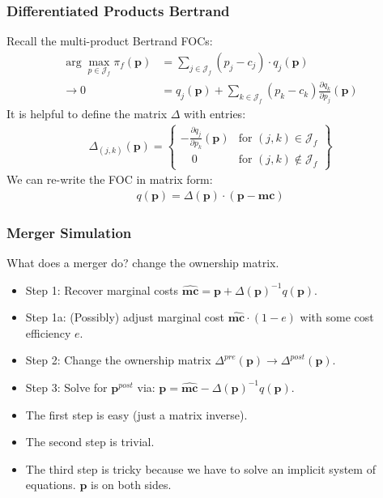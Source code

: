 \begin{frame}
\frametitle{Differentiated Products Bertrand}
\small
Recall the multi-product Bertrand FOCs:
\begin{align*}
\arg \max_{p \in \mathcal{J}_f} \pi_f (\mathbf{p}) &= \sum_{j \in \mathcal{J}_f} (p_j - c_j) \cdot q_j(\mathbf{p}) \\
\rightarrow 0&= q_j(\mathbf{p}) + \sum_{k \in \mathcal{J}_f} (p_k - c_k) \frac{\partial q_{k}}{\partial p_j}(\mathbf{p})
\end{align*}
It is helpful to define the matrix $\Delta$ with entries:
\begin{align*}
\Delta_{(j,k)}(\mathbf{p}) = \left\{\begin{array}{lr}
         - \frac{\partial q_{j}}{\partial p_k}(\mathbf{p}) & \text{for }  (j,k) \in \mathcal{J}_f\\
       	  \quad 0 & \text{for } (j,k) \notin \mathcal{J}_f
        \end{array} \right\}
\end{align*}
We can re-write the FOC in matrix form:
\begin{align*}
q(\mathbf{p}) = \Delta(\mathbf{p})\cdot(\mathbf{p}-\mathbf{mc})
\end{align*}
\end{frame}

\begin{frame}
\frametitle{Merger Simulation}
What does a merger do? \alert{change the ownership matrix}.
\begin{itemize}

\item Step 1: Recover marginal costs $\widehat{\mathbf{mc}} = \mathbf{p} +\Delta(\mathbf{p})^{-1}q(\mathbf{p})$.
\item Step 1a: (Possibly) adjust marginal cost $\widehat{\mathbf{mc}}\cdot (1-e)$ with some cost efficiency $e$.
\item Step 2: Change the ownership matrix $\Delta^{pre}(\mathbf{p}) \rightarrow \Delta^{post}(\mathbf{p})$.
\item Step 3: Solve for $\mathbf{p}^{post}$ via: $\mathbf{p} = \widehat{\mathbf{mc}} - \Delta(\mathbf{p})^{-1}q(\mathbf{p})$.
\end{itemize}
\pause
\vspace{0.5cm}
\begin{itemize}
\item The first step is easy (just a matrix inverse).
\item The second step is trivial.
\item The third step is tricky because we have to solve an implicit system of equations. $\mathbf{p}$ is on both sides.
\end{itemize}
\end{frame}


